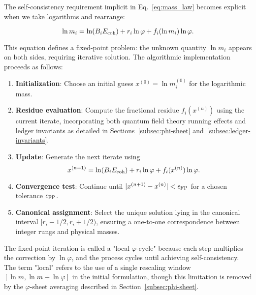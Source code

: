 \documentclass[%
amsmath,amssymb,
aps,
prb,
floatfix,
twocolumn
]{revtex4-2}
\begin{document}
The self-consistency requirement implicit in Eq.~\eqref{eq:mass_law} becomes explicit when we take logarithms and rearrange:

\begin{equation}
\ln m_i = \ln(B_i E_{\rm coh}) + r_i \ln \varphi + f_i(\ln m_i) \ln \varphi.
\label{eq:fixed_point_eq}
\end{equation}

This equation defines a fixed-point problem: the unknown quantity $\ln m_i$ appears on both sides, requiring iterative solution. The algorithmic implementation proceeds as follows:

\begin{enumerate}
\item \textbf{Initialization}: Choose an initial guess $x^{(0)} = \ln m_i^{(0)}$ for the logarithmic mass.

\item \textbf{Residue evaluation}: Compute the fractional residue $f_i(x^{(n)})$ using the current iterate, incorporating both quantum field theory running effects and ledger invariants as detailed in Sections~\ref{subsec:phi-sheet} and~\ref{subsec:ledger-invariants}.

\item \textbf{Update}: Generate the next iterate using
\begin{equation}
x^{(n+1)} = \ln(B_i E_{\rm coh}) + r_i \ln \varphi + f_i(x^{(n)}) \ln \varphi.
\label{eq:iteration}
\end{equation}

\item \textbf{Convergence test}: Continue until $|x^{(n+1)} - x^{(n)}| < \epsilon_{\rm FP}$ for a chosen tolerance $\epsilon_{\rm FP}$.

\item \textbf{Canonical assignment}: Select the unique solution lying in the canonical interval $[r_i - 1/2, r_i + 1/2)$, ensuring a one-to-one correspondence between integer rungs and physical masses.
\end{enumerate}

The fixed-point iteration is called a "local $\varphi$-cycle" because each step multiplies the correction by $\ln \varphi$, and the process cycles until achieving self-consistency. The term "local" refers to the use of a single rescaling window $[\ln m, \ln m + \ln \varphi]$ in the initial formulation, though this limitation is removed by the $\varphi$-sheet averaging described in Section~\ref{subsec:phi-sheet}.
\end{document}
